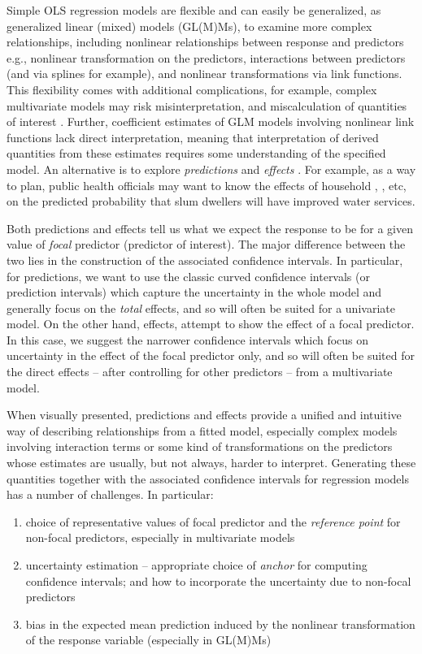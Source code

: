 Simple OLS regression models are flexible and can easily be generalized, as generalized linear (mixed) models (GL(M)Ms), to examine more complex relationships, including nonlinear relationships between response and predictors e.g., nonlinear transformation on the predictors, interactions between predictors (and via splines for example), and nonlinear transformations via link functions. This flexibility comes with additional complications, for example, complex multivariate models may risk misinterpretation, and miscalculation of quantities of interest \citep{berry_improving_2012, leeper2017interpreting}. Further, coefficient estimates of GLM models involving nonlinear link functions lack direct interpretation\citep{leeper2017interpreting}, meaning that interpretation of derived quantities from these estimates requires some understanding of the specified model. An alternative is to explore \emph{predictions} and \emph{effects} \citep{fox2009effect, leeper2017package, lenth2018package}.  For example, as a way to plan, public health officials may want to know the effects of household , , etc, on the predicted probability that slum dwellers will have improved water services. 

Both predictions and effects tell us what we expect the response to be for a given value of \emph{focal} predictor (predictor of interest). The major difference between the two lies in the construction of the associated confidence intervals. In particular, for predictions, we want to use the classic curved confidence intervals (or prediction intervals) which capture the uncertainty in the whole model and generally focus on the \emph{total} effects, and so will often be suited for a univariate model. On the other hand, effects, attempt to show the effect of a focal predictor. In this case, we suggest the narrower confidence intervals which focus on uncertainty in the effect of the focal predictor only, and so will often be suited for the direct effects – after controlling for other predictors – from a multivariate model.



When visually presented, predictions and effects provide a unified and intuitive way of describing relationships from a fitted model, especially complex models involving interaction terms or some kind of transformations on the predictors whose estimates are usually, but not always, harder to interpret. Generating these quantities together with the associated confidence intervals for regression models has a number of challenges. In particular:
\begin{enumerate}
\item choice of representative values of focal predictor and the \emph{reference point} for non-focal predictors, especially in multivariate models
\item  uncertainty estimation -- appropriate choice of \emph{anchor} for computing confidence intervals; and how to incorporate the uncertainty due to non-focal predictors 
\item bias in the expected mean prediction induced by the nonlinear transformation of the response variable (especially in GL(M)Ms)
\end{enumerate}

